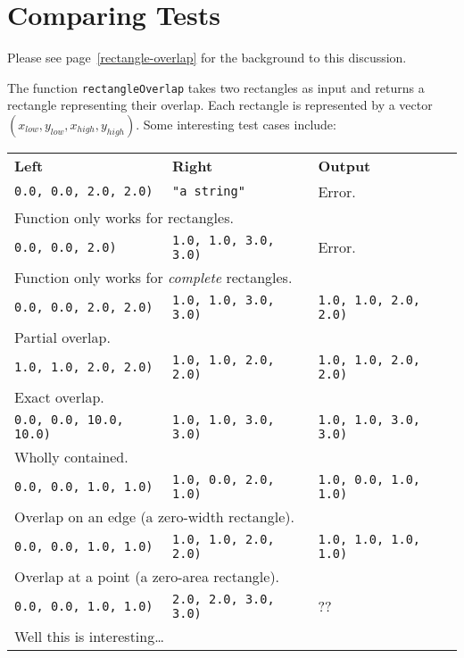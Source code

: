 \chapter{Comparing Tests}\label{testquestions}

Please see page~\ref{rectangle-overlap} for the background to this discussion.

The function \texttt{rectangleOverlap} takes two rectangles as input
and returns a rectangle representing their overlap.
Each rectangle is represented by a vector $(x_{low}, y_{low}, x_{high}, y_{high})$.
Some interesting test cases include:

\begin{tabular}{l|l|l}
  \textbf{Left}
  & \textbf{Right}
  & \textbf{Output}
  \\

  \texttt{0.0, 0.0, 2.0, 2.0)}
  & \texttt{"a string"}
  & Error.
  \\
  \multicolumn{3}{l}{Function only works for rectangles.}
  \\

  \texttt{0.0, 0.0, 2.0)}
  & \texttt{1.0, 1.0, 3.0, 3.0)}
  & Error.
  \\
  \multicolumn{3}{l}{Function only works for \emph{complete} rectangles.}
  \\

  \texttt{0.0, 0.0, 2.0, 2.0)}
  & \texttt{1.0, 1.0, 3.0, 3.0)}
  & \texttt{1.0, 1.0, 2.0, 2.0)}
  \\
  \multicolumn{3}{l}{Partial overlap.}
  \\

  \texttt{1.0, 1.0, 2.0, 2.0)}
  & \texttt{1.0, 1.0, 2.0, 2.0)}
  & \texttt{1.0, 1.0, 2.0, 2.0)}
  \\
  \multicolumn{3}{l}{Exact overlap.}
  \\

  \texttt{0.0, 0.0, 10.0, 10.0)}
  & \texttt{1.0, 1.0, 3.0, 3.0)}
  & \texttt{1.0, 1.0, 3.0, 3.0)}
  \\
  \multicolumn{3}{l}{Wholly contained.}
  \\

  \texttt{0.0, 0.0, 1.0, 1.0)}
  & \texttt{1.0, 0.0, 2.0, 1.0)}
  & \texttt{1.0, 0.0, 1.0, 1.0)}
  \\
  \multicolumn{3}{l}{Overlap on an edge (a zero-width rectangle).}
  \\

  \texttt{0.0, 0.0, 1.0, 1.0)}
  & \texttt{1.0, 1.0, 2.0, 2.0)}
  & \texttt{1.0, 1.0, 1.0, 1.0)}
  \\
  \multicolumn{3}{l}{Overlap at a point (a zero-area rectangle).}
  \\

  \texttt{0.0, 0.0, 1.0, 1.0)}
  & \texttt{2.0, 2.0, 3.0, 3.0)}
  & ??
  \\
  \multicolumn{3}{l}{Well this is interesting{\ldots}}
  \\
\end{tabular}

